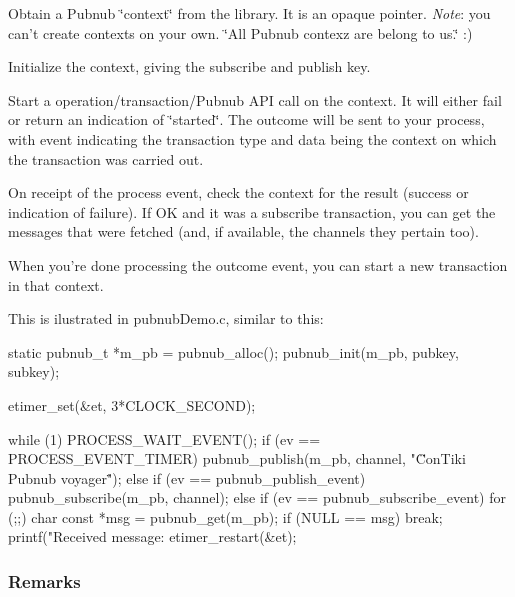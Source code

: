 \begin{DoxyEnumerate}
\item Obtain a Pubnub \char`\"{}context\char`\"{} from the library. It is an opaque pointer. {\itshape Note}\-: you can't create contexts on your own. \char`\"{}\-All Pubnub contexz
   are belong to us.\char`\"{} \-:)
\item Initialize the context, giving the subscribe and publish key.
\item Start a operation/transaction/\-Pubnub A\-P\-I call on the context. It will either fail or return an indication of \char`\"{}started\char`\"{}. The outcome will be sent to your process, with event indicating the transaction type and data being the context on which the transaction was carried out.
\item On receipt of the process event, check the context for the result (success or indication of failure). If O\-K and it was a subscribe transaction, you can get the messages that were fetched (and, if available, the channels they pertain too).
\item When you're done processing the outcome event, you can start a new transaction in that context.
\end{DoxyEnumerate}

This is ilustrated in pubnub\-Demo.\-c, similar to this\-: \begin{DoxyVerb}static pubnub_t *m_pb = pubnub_alloc();
pubnub_init(m_pb, pubkey, subkey);

etimer_set(&et, 3*CLOCK_SECOND);

while (1) {
    PROCESS_WAIT_EVENT();
    if (ev == PROCESS_EVENT_TIMER) {
        pubnub_publish(m_pb, channel, "\"ConTiki Pubnub voyager\"");
    }
    else if (ev == pubnub_publish_event) {
        pubnub_subscribe(m_pb, channel);
    }
    else if (ev == pubnub_subscribe_event) {
        for (;;) {
            char const *msg = pubnub_get(m_pb);
            if (NULL == msg) {
                break;
            }
            printf("Received message: %
        }
        etimer_restart(&et);
    }
}
\end{DoxyVerb}


\subsubsection*{Remarks}


